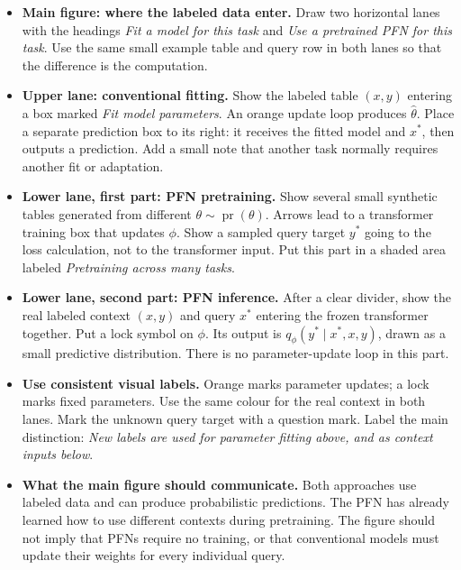 \documentclass[11pt]{article}
\newcommand{\pr}{\operatorname{pr}}
\newenvironment{notes}
  {\begin{itemize}\setlength{\itemsep}{0.45em}\setlength{\parsep}{0pt}}
  {\end{itemize}}
\begin{document}
\begin{notes}
    \item \textbf{Main figure: where the labeled data enter.}
    Draw two horizontal lanes with the headings
    \emph{Fit a model for this task} and
    \emph{Use a pretrained PFN for this task}.
    Use the same small example table and query row in both
    lanes so that the difference is the computation.

    \item \textbf{Upper lane: conventional fitting.}
    Show the labeled table \((x,y)\) entering a box marked
    \emph{Fit model parameters}. An orange update loop produces
    \(\widehat\theta\). Place a separate prediction box to its
    right: it receives the fitted model and \(x^\ast\), then
    outputs a prediction. Add a small note that another task
    normally requires another fit or adaptation.

    \item \textbf{Lower lane, first part: PFN pretraining.}
    Show several small synthetic tables generated from different
    \(\theta\sim\pr(\theta)\). Arrows lead to a transformer
    training box that updates \(\phi\). Show a sampled query
    target \(y^\ast\) going to the loss calculation, not to the
    transformer input. Put this part in a shaded area labeled
    \emph{Pretraining across many tasks}.

    \item \textbf{Lower lane, second part: PFN inference.}
    After a clear divider, show the real labeled context
    \((x,y)\) and query \(x^\ast\) entering the frozen transformer
    together. Put a lock symbol on \(\phi\). Its output is
    \(q_\phi(y^\ast\mid x^\ast,x,y)\), drawn as a small
    predictive distribution. There is no parameter-update loop
    in this part.

    \item \textbf{Use consistent visual labels.} Orange marks
    parameter updates; a lock marks fixed parameters.
    Use the same colour for the real context in both lanes.
    Mark the unknown query target with a question mark.
    Label the main distinction:
    \emph{New labels are used for parameter fitting above,
    and as context inputs below}.

    \item \textbf{What the main figure should communicate.}
    Both approaches use labeled data and can produce
    probabilistic predictions. The PFN has already learned how
    to use different contexts during pretraining.
    The figure should not imply that PFNs require no training,
    or that conventional models must update their weights for
    every individual query.


\end{notes}
\end{document}
